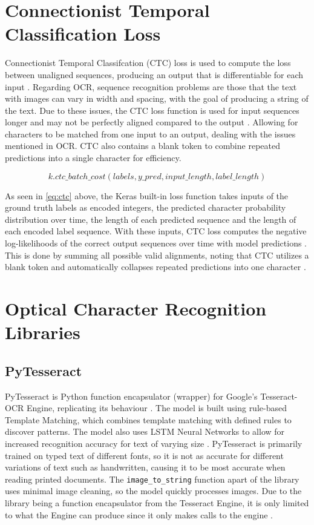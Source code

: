 \documentclass[9pt]{osa-supplemental-document}
\begin{document}
\section{Connectionist Temporal Classification Loss}
Connectionist Temporal Classifcation (CTC) loss is used to compute the loss between unaligned sequences, producing an output that is differentiable for each input \cite{gfg_ctc}. Regarding OCR, sequence recognition problems are those that the text with images can vary in width and spacing, with the goal of producing a string of the text. Due to these issues, the CTC loss function is used for input sequences longer and may not be perfectly aligned compared to the output \cite{gfg_ctc}. Allowing for characters to be matched from one input to an output, dealing with the issues mentioned in OCR. CTC also contains a blank token to combine repeated predictions into a single character for efficiency.

\begin{equation}
    k.ctc\_batch\_cost(labels, y\_pred, input\_length, label\_length)
    \label{eq:ctc}
\end{equation}

As seen in \eqref{eq:ctc} above, the Keras built-in loss function takes inputs of the ground truth labels as encoded integers, the predicted character probability distribution over time, the length of each predicted sequence and the length of each encoded label sequence. With these inputs, CTC loss computes the negative log-likelihoods of the correct output sequences over time with model predictions \cite{pytorch_ctc}. This is done by summing all possible valid alignments, noting that CTC utilizes a blank token and automatically collapses repeated predictions into one character \cite{pytorch_ctc}. 

\section{Optical Character Recognition Libraries}

\subsection{PyTesseract}
PyTesseract is Python function encapsulator (wrapper) for Google's Tesseract-OCR Engine, replicating its behaviour \cite{pytesseract}. The model is built using rule-based Template Matching, which combines template matching with defined rules to discover patterns. The model also uses LSTM Neural Networks to allow for increased recognition accuracy for text of varying size \cite{pytesseract}. PyTesseract is primarily trained on typed text of different fonts, so it is not as accurate for different variations of text such as handwritten, causing it to be most accurate when reading printed documents. The \verb|image_to_string| function apart of the library uses minimal image cleaning, so the model quickly processes images. Due to the library being a function encapsulator from the Tesseract Engine, it is only limited to what the Engine can produce since it only makes calls to the engine \cite{pytesseract}.
\end{document}
